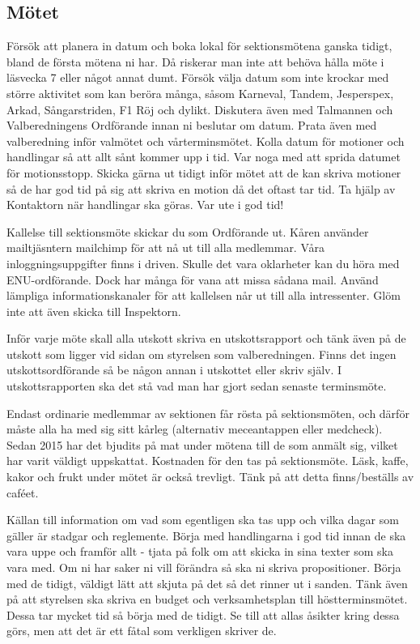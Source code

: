 \documentclass[10pt]{article}
\begin{document}
    \subsection{Mötet}
    
    Försök att planera in datum och boka lokal för sektionsmötena ganska tidigt, bland de första mötena ni har. Då riskerar man inte att behöva hålla möte i läsvecka 7 eller något annat dumt. Försök välja datum som inte krockar med större aktivitet som kan beröra många, såsom Karneval, Tandem, Jesperspex, Arkad, Sångarstriden, F1 Röj och dylikt. Diskutera även med Talmannen och Valberedningens Ordförande innan ni beslutar om datum. Prata även med valberedning inför valmötet och vårterminsmötet. Kolla datum för motioner och handlingar så att allt sånt kommer upp i tid. Var noga med att sprida datumet för motionsstopp. Skicka gärna ut tidigt inför mötet att de kan skriva motioner så de har god tid på sig att skriva en motion då det oftast tar tid. Ta hjälp av Kontaktorn när handlingar ska göras. Var ute i god tid!
    
    Kallelse till sektionsmöte skickar du som Ordförande ut. Kåren använder mailtjäsntern mailchimp för att nå ut till alla medlemmar. Våra inloggningsuppgifter finns i driven. Skulle det vara oklarheter kan du höra med ENU-ordförande. Dock har många för vana att missa sådana mail. Använd lämpliga informationskanaler för att kallelsen når ut till alla intressenter. Glöm inte att även skicka till Inspektorn.
    
    Inför varje möte skall alla utskott skriva en utskottsrapport och tänk även på de utskott som ligger vid sidan om styrelsen som valberedningen. Finns det ingen utskottsordförande så be någon annan i utskottet eller skriv själv. I utskottsrapporten ska det stå vad man har gjort sedan senaste terminsmöte.
    
    Endast ordinarie medlemmar av sektionen får rösta på sektionsmöten, och därför måste alla ha med sig sitt kårleg (alternativ meceantappen eller medcheck). Sedan 2015 har det bjudits på mat under mötena till de som anmält sig, vilket har varit väldigt uppskattat. Kostnaden för den tas på sektionsmöte. Läsk, kaffe, kakor och frukt under mötet är också trevligt. Tänk på att detta finns/beställs av caféet.
    
    Källan till information om vad som egentligen ska tas upp och vilka dagar som gäller är stadgar och reglemente. Börja med handlingarna i god tid innan de ska vara uppe och framför allt - tjata på folk om att skicka in sina texter som ska vara med. Om ni har saker ni vill förändra så ska ni skriva propositioner. Börja med de tidigt, väldigt lätt att skjuta på det så det rinner ut i sanden. Tänk även på att styrelsen ska skriva en budget och verksamhetsplan till höstterminsmötet. Dessa tar mycket tid så börja med de tidigt. Se till att allas åsikter kring dessa görs, men att det är ett fåtal som verkligen skriver de.
    
\end{document}
